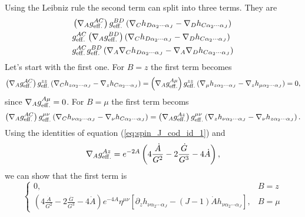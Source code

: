 \documentclass[a4paper,12pt]{article}
\begin{document}
Using the Leibniz rule the second term can split into three terms. They are
\begin{align}
&\left(\nabla_A g^{AC}_{\rm{eff.}}\right) g^{BD}_{\rm {eff.}} \left(\nabla_C h_{D \alpha_2 \cdots \alpha_J} - \nabla_D h_{C \alpha_2 \cdots \alpha_J}\right) \\
&g^{AC}_{\rm{eff.}}\left(\nabla_A g^{BD}_{\rm{eff.}}\right) \left(\nabla_C h_{D \alpha_2 \cdots \alpha_J} - \nabla_D h_{C \alpha_2 \cdots \alpha_J}\right) \\
& g^{AC}_{\rm{eff.}}g^{BD}_{\rm{eff.}} \left( \nabla_A \nabla_C h_{D \alpha_2 \cdots \alpha_J} - \nabla_A \nabla_D h_{C \alpha_2 \cdots \alpha_J}\right)
\end{align}
Let's start with the first one. For $B = z$ the first term becomes
\begin{equation}
\left(\nabla_A g^{AC}_{\rm{eff.}}\right) g^{zz}_{\rm {eff.}} \left(\nabla_C h_{z \alpha_2 \cdots \alpha_J} - \nabla_z h_{C \alpha_2 \cdots \alpha_J}\right) = \left(\nabla_A g^{A\mu}_{\rm{eff.}}\right) g^{zz}_{\rm {eff.}} \left(\nabla_\mu h_{z \alpha_2 \cdots \alpha_J} - \nabla_z h_{\mu \alpha_2 \cdots \alpha_J}\right) = 0,
\end{equation}
since $\nabla_A g^{A\mu}_{\rm{eff.}} = 0$.
For $B = \mu$ the first term becoms
\begin{equation}
\left(\nabla_A g^{AC}_{\rm{eff.}}\right) g^{\mu\nu}_{\rm {eff.}} \left(\nabla_C h_{\nu \alpha_2 \cdots \alpha_J} - \nabla_\nu h_{C \alpha_2 \cdots \alpha_J}\right) = \left(\nabla_A g^{Az}_{\rm{eff.}}\right) g^{\mu\nu}_{\rm {eff.}} \left(\nabla_z h_{\nu \alpha_2 \cdots \alpha_J} - \nabla_\nu h_{z \alpha_2 \cdots \alpha_J}\right).
\end{equation}
Using the identities of equation (\ref{eq:spin_J_cod_id_1}) and
\begin{align}
\nabla_A g^{Az}_{\rm{eff.}} = e^{-2A} \left( 4 \frac{\dot{A}}{G^2} - 2 \frac{\dot{G}}{G^3} - 4 \dot{A} \right),
\end{align}
we can show that the first term is
\begin{equation}
\begin{cases}
0, & B = z \\
\left( 4 \frac{\dot{A}}{G^2} - 2 \frac{\dot{G}}{G^3} - 4 \dot{A} \right) e^{-4A} \eta^{\mu \nu} \left[ \partial_z h_{\nu \alpha_2 \cdots \alpha_J} - \left(J-1\right) \dot{A} h_{\nu \alpha_2 \cdots \alpha_J} \right],  &B = \mu
\end{cases}
\end{equation}
\end{document}
